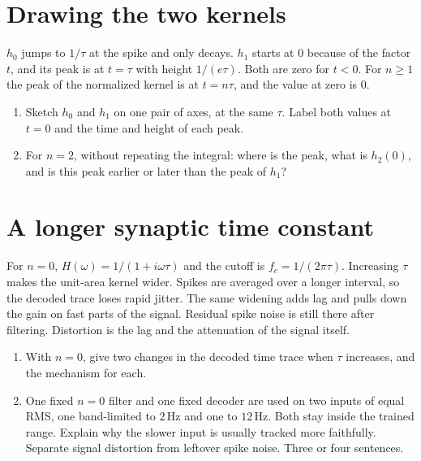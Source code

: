 \documentclass[11pt,letterpaper]{article}
\begin{document}
\section{Drawing the two kernels}

\begin{idea}
$h_0$ jumps to $1/\tau$ at the spike and only decays. $h_1$ starts at $0$ because of the factor $t$, and its peak is at $t = \tau$ with height $1/(e\tau)$. Both are zero for $t < 0$. For $n \ge 1$ the peak of the normalized kernel is at $t = n\tau$, and the value at zero is $0$.
\end{idea}

\begin{enumerate}
\item Sketch $h_0$ and $h_1$ on one pair of axes, at the same $\tau$. Label both values at $t = 0$ and the time and height of each peak.
\item For $n = 2$, without repeating the integral: where is the peak, what is $h_2(0)$, and is this peak earlier or later than the peak of $h_1$?
\end{enumerate}

\section{A longer synaptic time constant}

\begin{idea}
For $n = 0$, $H(\omega) = 1/(1 + i\omega\tau)$ and the cutoff is $f_c = 1/(2\pi\tau)$. Increasing $\tau$ makes the unit-area kernel wider. Spikes are averaged over a longer interval, so the decoded trace loses rapid jitter. The same widening adds lag and pulls down the gain on fast parts of the signal. Residual spike noise is still there after filtering. Distortion is the lag and the attenuation of the signal itself.
\end{idea}

\begin{enumerate}
\item With $n = 0$, give two changes in the decoded time trace when $\tau$ increases, and the mechanism for each.
\item One fixed $n = 0$ filter and one fixed decoder are used on two inputs of equal RMS, one band-limited to $2\,\mathrm{Hz}$ and one to $12\,\mathrm{Hz}$. Both stay inside the trained range. Explain why the slower input is usually tracked more faithfully. Separate signal distortion from leftover spike noise. Three or four sentences.
\end{enumerate}
\end{document}
